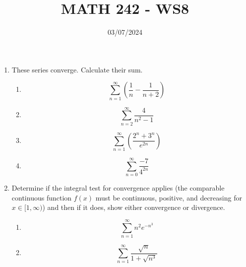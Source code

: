 \documentclass[12pt]{article}
\title{MATH 242 - WS8}
\date{03/07/2024}
\begin{document}
\maketitle


\begin{enumerate}

\item These series converge. Calculate their sum.
\begin{enumerate}
    \item $$\sum_{n=1}^{\infty}\left(\frac{1}{n}-\frac{1}{n+2}\right)$$
    \vfill
    \item $$\sum_{n=2}^{\infty}\frac{4}{n^2-1}$$
    \vfill
    \newpage
    \item $$\sum_{n=1}^{\infty}\left(\frac{2^n+3^n}{e^{2n}}\right)$$
    \vfill
    \item $$\sum_{n=0}^{\infty}\frac{-7}{4^{2n}}$$
    \vfill
    \newpage
\end{enumerate}
\item Determine if the integral test for convergence applies (the comparable continuous function $f(x)$ must be continuous, positive, and decreasing for $x\in[1,\infty)$) and then if it does, show either convergence or divergence.
\begin{enumerate}
    \item $$\sum_{n=1}^{\infty}n^2e^{-n^3}$$
    \newpage
    \item $$\sum_{n=1}^{\infty}\frac{\sqrt{n}}{1+\sqrt{n^3}}$$
\end{enumerate}


\end{enumerate}
\end{document}

